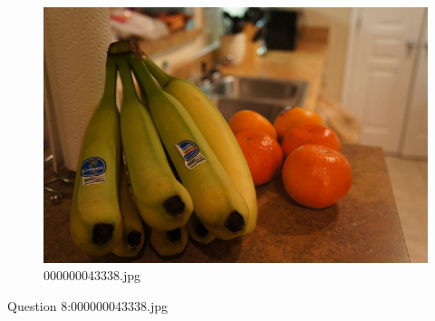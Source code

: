    \begin{figure}[h]
        \centering
        \includegraphics[width=0.8\linewidth]{../image set/easy/000000043338.jpg}
        \caption{000000043338.jpg}
    \end{figure}
    Question 8:000000043338.jpg

